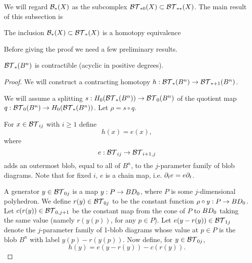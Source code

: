 We will regard ${\mathcal B}_*(X)$ as the subcomplex ${\mathcal{BT}}_{*0}(X) \subset {\mathcal{BT}}_{**}(X)$.
The main result of this subsection is

\begin{lemma} \label{lem:bc-btc}
The inclusion ${\mathcal B}_*(X) \subset {\mathcal{BT}}_*(X)$ is a homotopy equivalence
\end{lemma}

Before giving the proof we need a few preliminary results.

\begin{lemma} \label{bt-contract}
${\mathcal{BT}}_*(B^n)$ is contractible (acyclic in positive degrees).
\end{lemma}
\begin{proof}
We will construct a contracting homotopy $h: {\mathcal{BT}}_*(B^n)\to {\mathcal{BT}}_{*+1}(B^n)$.

We will assume a splitting $s:H_0({\mathcal{BT}}_*(B^n))\to {\mathcal{BT}}_0(B^n)$
of the quotient map $q:{\mathcal{BT}}_0(B^n)\to H_0({\mathcal{BT}}_*(B^n))$.
Let $\rho = s\circ q$.

For $x\in {\mathcal{BT}}_{ij}$ with $i\ge 1$ define
\[
	h(x) = e(x) ,
\]
where
\[
	e: {\mathcal{BT}}_{ij}\to{\mathcal{BT}}_{i+1,j}
\]
adds an outermost blob, equal to all of $B^n$, to the $j$-parameter family of blob diagrams.
Note that for fixed $i$, $e$ is a chain map, i.e. $\partial_t e = e \partial_t$.

A generator $y\in {\mathcal{BT}}_{0j}$ is a map $y:P\to BD_0$, where $P$ is some $j$-dimensional polyhedron.
We define $r(y)\in {\mathcal{BT}}_{0j}$ to be the constant function $\rho\circ y : P\to BD_0$. 
Let $c(r(y))\in {\mathcal{BT}}_{0,j+1}$ be the constant map from the cone of $P$ to $BD_0$ taking
the same value (namely $r(y(p))$, for any $p\in P$).
Let $e(y - r(y)) \in {\mathcal{BT}}_{1j}$ denote the $j$-parameter family of 1-blob diagrams
whose value at $p\in P$ is the blob $B^n$ with label $y(p) - r(y(p))$.
Now define, for $y\in {\mathcal{BT}}_{0j}$,
\[
	h(y) = e(y - r(y)) - c(r(y)) .
\]


\end{proof}
